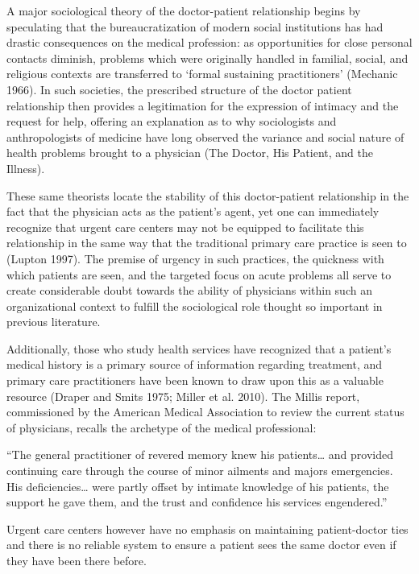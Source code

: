 \documentclass[12pt,twoside]{reedthesis}
\begin{document}
  A major sociological theory of the doctor-patient relationship begins by
  speculating that the bureaucratization of modern social institutions has
  had drastic consequences on the medical profession: as opportunities for
  close personal contacts diminish, problems which were originally handled
  in familial, social, and religious contexts are transferred to `formal
  sustaining practitioners' (Mechanic 1966). In such societies, the
  prescribed structure of the doctor patient relationship then provides a
  legitimation for the expression of intimacy and the request for help,
  offering an explanation as to why sociologists and anthropologists of
  medicine have long observed the variance and social nature of health
  problems brought to a physician (The Doctor, His Patient, and the
  Illness).
  
  These same theorists locate the stability of this doctor-patient
  relationship in the fact that the physician acts as the patient's agent,
  yet one can immediately recognize that urgent care centers may not be
  equipped to facilitate this relationship in the same way that the
  traditional primary care practice is seen to (Lupton 1997). The premise
  of urgency in such practices, the quickness with which patients are
  seen, and the targeted focus on acute problems all serve to create
  considerable doubt towards the ability of physicians within such an
  organizational context to fulfill the sociological role thought so
  important in previous literature.
  
  Additionally, those who study health services have recognized that a
  patient's medical history is a primary source of information regarding
  treatment, and primary care practitioners have been known to draw upon
  this as a valuable resource (Draper and Smits 1975; Miller et al. 2010).
  The Millis report, commissioned by the American Medical Association to
  review the current status of physicians, recalls the archetype of the
  medical professional:
  
  ``The general practitioner of revered memory knew his patients\ldots{}
  and provided continuing care through the course of minor ailments and
  majors emergencies. His deficiencies\ldots{} were partly offset by
  intimate knowledge of his patients, the support he gave them, and the
  trust and confidence his services engendered.''
  
  Urgent care centers however have no emphasis on maintaining
  patient-doctor ties and there is no reliable system to ensure a patient
  sees the same doctor even if they have been there before.
  
\end{document}
